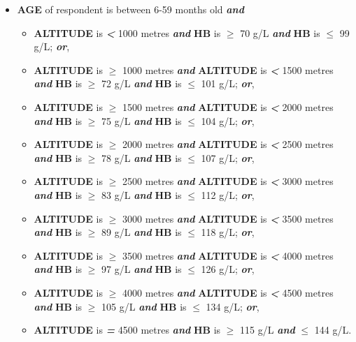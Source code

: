 \documentclass[12pt,a4paper]{article}
\begin{document}
\begin{itemize}
\item
  \textbf{AGE} of respondent is between 6-59 months old \textbf{\emph{and}}

  \begin{itemize}
  \item
    \textbf{ALTITUDE} is \textbf{\emph{\textless{}}} 1000 metres \textbf{\emph{and}} \textbf{HB} is \textbf{\emph{\(\geq\)}} 70 g/L \textbf{\emph{and}} \textbf{HB}
    is \textbf{\emph{\(\leq\)}} 99 g/L; \textbf{\emph{or}},
  \item
    \textbf{ALTITUDE} is \textbf{\emph{\(\geq\)}} 1000 metres \textbf{\emph{and}} \textbf{ALTITUDE} is \textbf{\emph{\textless{}}} 1500 metres \textbf{\emph{and}} \textbf{HB} is \textbf{\emph{\(\geq\)}} 72 g/L \textbf{\emph{and}} \textbf{HB} is \textbf{\emph{\(\leq\)}} 101 g/L; \textbf{\emph{or}},
  \item
    \textbf{ALTITUDE} is \textbf{\emph{\(\geq\)}} 1500 metres \textbf{\emph{and}} \textbf{ALTITUDE} is \textbf{\emph{\textless{}}} 2000 metres \textbf{\emph{and}} \textbf{HB} is \textbf{\emph{\(\geq\)}} 75 g/L \textbf{\emph{and}} \textbf{HB} is \textbf{\emph{\(\leq\)}} 104 g/L; \textbf{\emph{or}},
  \item
    \textbf{ALTITUDE} is \textbf{\emph{\(\geq\)}} 2000 metres \textbf{\emph{and}} \textbf{ALTITUDE} is \textbf{\emph{\textless{}}} 2500 metres \textbf{\emph{and}} \textbf{HB} is \textbf{\emph{\(\geq\)}} 78 g/L \textbf{\emph{and}} \textbf{HB} is \textbf{\emph{\(\leq\)}} 107 g/L; \textbf{\emph{or}},
  \item
    \textbf{ALTITUDE} is \textbf{\emph{\(\geq\)}} 2500 metres \textbf{\emph{and}} \textbf{ALTITUDE} is \textbf{\emph{\textless{}}} 3000 metres \textbf{\emph{and}} \textbf{HB} is \textbf{\emph{\(\geq\)}} 83 g/L \textbf{\emph{and}} \textbf{HB} is \textbf{\emph{\(\leq\)}} 112 g/L; \textbf{\emph{or}},
  \item
    \textbf{ALTITUDE} is \textbf{\emph{\(\geq\)}} 3000 metres \textbf{\emph{and}} \textbf{ALTITUDE} is \textbf{\emph{\textless{}}} 3500 metres \textbf{\emph{and}} \textbf{HB} is \textbf{\emph{\(\geq\)}} 89 g/L \textbf{\emph{and}} \textbf{HB} is \textbf{\emph{\(\leq\)}} 118 g/L; \textbf{\emph{or}},
  \item
    \textbf{ALTITUDE} is \textbf{\emph{\(\geq\)}} 3500 metres \textbf{\emph{and}} \textbf{ALTITUDE} is \textbf{\emph{\textless{}}} 4000 metres \textbf{\emph{and}} \textbf{HB} is \textbf{\emph{\(\geq\)}} 97 g/L \textbf{\emph{and}} \textbf{HB} is \textbf{\emph{\(\leq\)}} 126 g/L; \textbf{\emph{or}},
  \item
    \textbf{ALTITUDE} is \textbf{\emph{\(\geq\)}} 4000 metres \textbf{\emph{and}} \textbf{ALTITUDE} is \textbf{\emph{\textless{}}} 4500 metres \textbf{\emph{and}} \textbf{HB} is \textbf{\emph{\(\geq\)}} 105 g/L \textbf{\emph{and}} \textbf{HB} is \textbf{\emph{\(\leq\)}} 134 g/L; \textbf{\emph{or}},
  \item
    \textbf{ALTITUDE} is \textbf{\emph{=}} 4500 metres \textbf{\emph{and}} \textbf{HB} is \textbf{\emph{\(\geq\)}} 115 g/L \textbf{\emph{and}} \textbf{\emph{\(\leq\)}} 144 g/L.
  \end{itemize}
\end{itemize}
\end{document}
